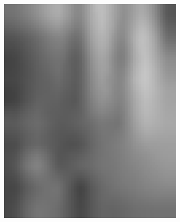 \begin{figure}[h!]
	\centering
	
	\begin{subfigure}{0.22\textwidth}
		\includegraphics[width=\linewidth]{Images/KDDProcess/firstFilter}
		\caption{}    %
		\label{subfig:firstFilter}
	\end{subfigure}
	\hfill
	\begin{subfigure}{0.22\textwidth}

\end{subfigure}
\end{figure}
